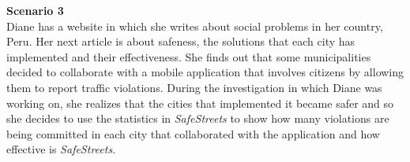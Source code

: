 \noindent\textbf{Scenario 3}\\
Diane has a website in which she writes about social problems in her country, Peru. Her next article is about safeness, the solutions that each city has implemented and their effectiveness. She finds out that some municipalities decided to collaborate with a mobile application that involves citizens by allowing them to report traffic violations. During the investigation in which Diane was working on, she realizes that the cities that implemented it became safer and so she decides to use the statistics in \textit{SafeStreets} to show how many violations are being committed in each city that collaborated with the application and how effective is \textit{SafeStreets}.


